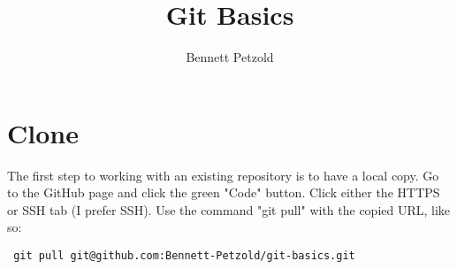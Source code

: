 \documentclass[letterpaper, 12pt]{article}
\title{Git Basics}
\author{Bennett Petzold}
\begin{document}
	\maketitle
	\section*{Clone}
	The first step to working with an existing repository is to have a local copy.
	Go to the GitHub page and click the green "Code" button.
	Click either the HTTPS or SSH tab (I prefer SSH).
	Use the command "git pull" with the copied URL, like so:
	\begin{verbatim} git pull git@github.com:Bennett-Petzold/git-basics.git \end{verbatim}
\end{document}
